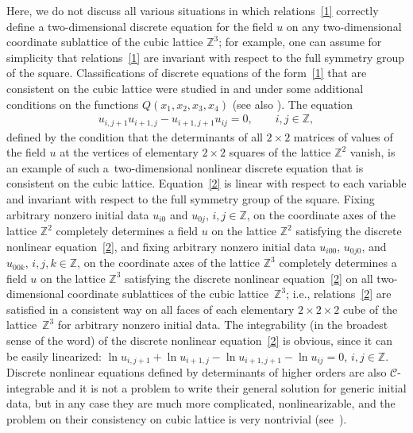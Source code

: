 \documentclass[11pt]{article}
\begin{document}
Here, we do not discuss all various situations in which relations~\eqref{1}
correctly def\/ine a two-dimensional discrete equation for
the f\/ield $u$ on any two-dimensional coordinate sublattice of the
cubic lattice $\mathbb{Z}^3$; for example, one can assume for
simplicity that relations~\eqref{1} are invariant with respect to
the full symmetry group of the square. Classif\/ications of discrete
equations of the form~\eqref{1} that are consistent on the cubic
lattice were studied in \cite{6} and \cite{10} under some additional
conditions on the functions $Q (x_1, x_2, x_3, x_4)$ (see also
\cite{11}). The equation
\begin{gather} u_{i, j + 1} u_{i + 1, j} - u_{i + 1, j + 1}
u_{i j} = 0, \qquad i, j \in \mathbb{Z}, \label{2}
\end{gather}
def\/ined by
the condition that the determinants of all $2\times2$ matrices of
values of the f\/ield $u$ at the vertices of elementary $2\times2$
squares of the lattice $\mathbb Z^2$ vanish, is an example of such a~two-dimensional nonlinear discrete equation that is consistent on
the cubic lattice. Equation~\eqref{2} is linear with respect to each
variable and invariant with respect to the full symmetry group of
the square. Fixing arbitrary nonzero initial data $u_{i 0}$ and
$u_{0 j}$, $i, j \in \mathbb{Z}$, on the coordinate axes of the
lattice $\mathbb{Z}^2$ completely determines a f\/ield $u$ on the
lattice $\mathbb{Z}^2$ satisfying the discrete nonlinear equation~\eqref{2},
and f\/ixing arbitrary nonzero initial data $u_{i  0 0}$,
$u_{ 0 j 0}$, and $u_{0 0 k}$, $i, j, k \in \mathbb{Z}$, on the
coordinate axes of the lattice $\mathbb{Z}^3$ completely determines
a f\/ield $u$ on the lattice $\mathbb{Z}^3$ satisfying the discrete
nonlinear equation~\eqref{2} on all two-dimensional coordinate
sublattices of the cubic lattice~$\mathbb{Z}^3$; i.e., relations~\eqref{2}
are satisf\/ied in a consistent way on all faces of each
elementary $2 \times 2 \times 2$ cube of the lattice~$\mathbb{Z}^3$
for arbitrary nonzero initial data. The integrability (in the
broadest sense of the word) of the discrete nonlinear equation~\eqref{2}
is obvious, since it can be easily linearized: $ \ln u_{i,
j + 1} + \ln u_{i + 1, j} - \ln u_{i + 1, j + 1} - \ln u_{i j} = 0$,
$i, j \in \mathbb{Z}$.
Discrete nonlinear equations def\/ined by determinants of higher
orders are also $\mathcal{C}$-integrable and it is not a problem
to write their general solution for generic initial data, but in any case they are much more complicated, nonlinearizable,
and the problem on their consistency on cubic
lattice is very nontrivial (see~\cite{1, 2}).
\end{document}
